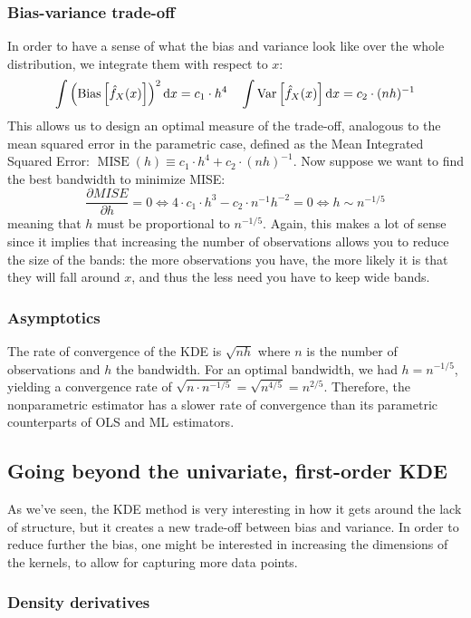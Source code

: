 \subsubsection{Bias-variance trade-off}

In order to have a sense of what the bias and variance look like over the whole distribution, we integrate them with respect to $x$: $$\int \left(\operatorname{Bias}\left[\hat f_X(x)\right]\right)^2 \mathrm{d} x = c_1 \cdot h^4 \quad \int \operatorname{Var}\left[\hat f_X(x)\right] \mathrm{d} x = c_2 \cdot (nh)^{-1} $$ This allows us to design an optimal measure of the trade-off, analogous to the mean squared error in the parametric case, defined as the Mean Integrated Squared Error: $\operatorname{MISE}(h) \equiv c_1 \cdot h^4 + c_2 \cdot (nh)^{-1} $. Now suppose we want to find the best bandwidth to minimize MISE: $$\frac{\partial MISE}{\partial h} = 0 \Leftrightarrow 4\cdot c_1\cdot h^3 - c_2\cdot n^{-1} h^{-2} = 0 \Leftrightarrow h \sim n^{-1/5} $$ meaning that $h$ must be proportional to $n^{-1/5}$. Again, this makes a lot of sense since it implies that increasing the number of observations allows you to reduce the size of the bands: the more observations you have, the more likely it is that they will fall around $x$, and thus the less need you have to keep wide bands.

\subsubsection{Asymptotics}

The rate of convergence of the KDE is $\sqrt{nh}$ where $n$ is the number of observations and $h$ the bandwidth. For an optimal bandwidth, we had $h = n^{-1/5}$, yielding a convergence rate of $\sqrt{n\cdot n^{-1/5}} = \sqrt{n^{4/5}} = n^{2/5}$. Therefore, the nonparametric estimator has a slower rate of convergence than its parametric counterparts of OLS and ML estimators.

\subsection{Going beyond the univariate, first-order KDE}

As we've seen, the KDE method is very interesting in how it gets around the lack of structure, but it creates a new trade-off between bias and variance. In order to reduce further the bias, one might be interested in increasing the dimensions of the kernels, to allow for capturing more data points.

\subsubsection{Density derivatives}

